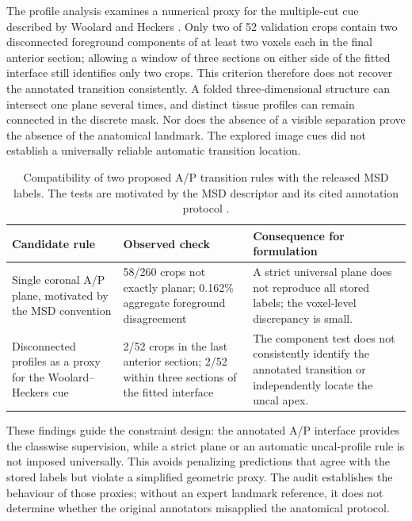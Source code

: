 \documentclass[12pt,a4paper]{article}
\begin{document}
The profile analysis examines a numerical proxy for the multiple-cut
cue described by Woolard and Heckers \cite{woolard2012asymmetry}.
Only two of 52 validation crops contain two disconnected foreground
components of at least two voxels each in the final anterior section;
allowing a window of three sections on either side of the fitted
interface still identifies only two crops. This criterion therefore
does not recover the annotated transition consistently. A folded
three-dimensional structure can intersect one plane several times,
and distinct tissue profiles can remain connected in the discrete mask.
Nor does the absence of a visible separation prove the absence of the
anatomical landmark. The explored image cues did not establish a
universally reliable automatic transition location.

\begin{table}[htbp]
\centering\small{}
\begin{tabular}{@{}P{3.6cm}P{4.2cm}P{6.8cm}@{}}
\hline
Candidate rule & Observed check & Consequence for formulation \\
\hline
Single coronal A/P plane, motivated by the MSD convention & 58/260 crops not exactly planar; 0.162\% aggregate foreground disagreement & A strict universal plane does not reproduce all stored labels; the voxel-level discrepancy is small. \\[.6em]
Disconnected profiles as a proxy for the Woolard--Heckers cue & 2/52 crops in the last anterior section; 2/52 within three sections of the fitted interface & The component test does not consistently identify the annotated transition or independently locate the uncal apex. \\
\hline
\end{tabular}
\caption{Compatibility of two proposed A/P transition rules with the
released MSD labels. The tests are motivated by the MSD descriptor and
its cited annotation protocol \cite{simpson2019dataset,woolard2012asymmetry}.}
\label{tab:annotation-audit-results}
\end{table}

These findings guide the constraint design: the annotated A/P interface
provides the classwise supervision, while a strict plane or an automatic
uncal-profile rule is not imposed universally. This avoids penalizing
predictions that agree with the stored labels but violate a simplified
geometric proxy. The audit establishes the behaviour of those proxies;
without an expert landmark reference, it does not determine whether
the original annotators misapplied the anatomical protocol.
\end{document}
